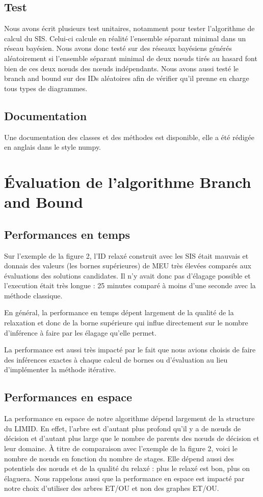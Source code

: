 \documentclass[12pt]{article}
\begin{document}
\subsection{Test}
Nous avons écrit plusieurs test unitaires, notamment pour tester l'algorithme de calcul du SIS. Celui-ci calcule en réalité l'ensemble séparant minimal dans un réseau bayésien. Nous avons donc testé sur des réseaux bayésiens générés aléatoirement si l'ensemble séparant minimal de deux nœuds tirés au hasard font bien de ces deux nœuds des nœuds indépendants. Nous avons aussi testé le branch and bound sur des IDs aléatoires afin de vérifier qu'il prenne en charge tous types de diagrammes.

\subsection{Documentation}
Une documentation des classes et des méthodes est disponible, elle a été rédigée en anglais dans le style numpy.
\section{Évaluation de l'algorithme Branch and Bound}
\subsection{Performances en temps}
Sur l'exemple de la figure 2, l'ID relaxé construit avec les SIS était mauvais et donnais des valeurs (les bornes supérieures) de MEU très élevées comparés aux évaluations des solutions candidates. Il n'y avait donc pas d'élagage possible et l'execution était très longue : 25 minutes comparé à moins d'une seconde avec la méthode classique.

En général, la performance en temps dépent largement de la qualité de la relaxation et donc de la borne supérieure qui influe directement sur le nombre d'inférence à faire par les élagage qu'elle permet.

La performance est aussi très impacté par le fait que nous avions choisis de faire des inférences exactes à chaque calcul de bornes ou d'évaluation au lieu d'implémenter la méthode itérative.
\subsection{Performances en espace}
La performance en espace de notre algorithme dépend largement de la structure du LIMID. En effet, l'arbre est d'autant plus profond qu'il y a de nœuds de décision et d'autant plus large que le nombre de parents des nœuds de décision et leur domaine. À titre de comparaison avec l'exemple de la figure 2, voici le nombre de nœuds en fonction du nombre de stages. Elle dépend aussi des potentiels des nœuds et de la qualité du relaxé : plus le relaxé est bon, plus on élaguera. Nous rappelons aussi que la performance en espace est impacté par notre choix d'utiliser des arbres ET/OU et non des graphes ET/OU.
\end{document}
